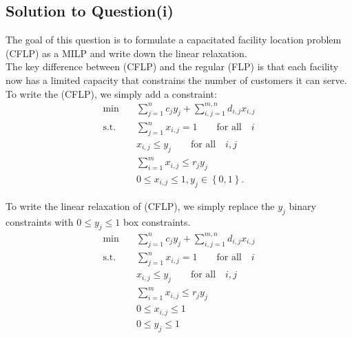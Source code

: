 \documentclass[a4paper]{article}
\begin{document}
\subsection{Solution to Question(i)}
The goal of this question is to formulate a capacitated facility location problem (CFLP) as a MILP and write down the linear relaxation.\\
The key difference between (CFLP) and the regular (FLP) is that each facility now has a limited capacity that constrains the number of customers it can serve.\\
To write the (CFLP), we simply add a constraint:
\begin{align*}
    \text{min} \quad &\sum_{j=1}^n c_jy_j+\sum_{i,j=1}^{m,n} d_{i,j}x_{i,j}\\
    \text{s.t.}\quad &\sum_{j=1}^n x_{i,j}=1 \qquad\text{for all} \quad i\\\tag{CFLP}
    &x_{i,j} \leq y_j \qquad\text{for all} \quad i,j\\
    &\sum_{i=1}^m x_{i,j} \leq r_j y_j\\
    &0\leq x_{i,j}\leq 1 ,y_{j}\in \left\{0,1\right\} .
\end{align*}

To write the linear relaxation of (CFLP), we simply replace the $y_j$ binary constraints with $0 \leq y_j \leq 1$ box constraints.\\
\begin{align*}
    \text{min} \quad &\sum_{j=1}^n c_jy_j+\sum_{i,j=1}^{m,n} d_{i,j}x_{i,j}\\
    \text{s.t.}\quad &\sum_{j=1}^n x_{i,j}=1 \qquad\text{for all} \quad i\\\tag{CFLP-LR}
    &x_{i,j} \leq y_j \qquad\text{for all} \quad i,j\\
    &\sum_{i=1}^m x_{i,j} \leq r_j y_j\\
    &0\leq x_{i,j}\leq 1\\
    &0\leq y_{j}\leq 1 
\end{align*}
\end{document}
